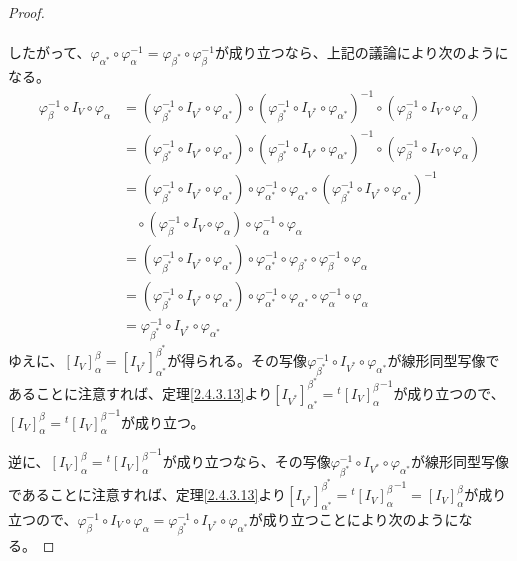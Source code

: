 \documentclass[dvipdfmx]{jsarticle}
\begin{document}
\begin{proof}
\begin{align*}
\end{align*}\par
したがって、$\varphi_{\alpha^{*}} \circ \varphi_{\alpha}^{- 1} = \varphi_{\beta^{*}} \circ \varphi_{\beta}^{- 1}$が成り立つなら、上記の議論により次のようになる。
\begin{align*}
\varphi_{\beta}^{- 1} \circ I_{V} \circ \varphi_{\alpha} &= \left( \varphi_{\beta^{*}}^{- 1} \circ I_{V^{*}} \circ \varphi_{\alpha^{*}} \right) \circ \left( \varphi_{\beta^{*}}^{- 1} \circ I_{V^{*}} \circ \varphi_{\alpha^{*}} \right)^{- 1} \circ \left( \varphi_{\beta}^{- 1} \circ I_{V} \circ \varphi_{\alpha} \right)\\
&= \left( \varphi_{\beta^{*}}^{- 1} \circ I_{V^{*}} \circ \varphi_{\alpha^{*}} \right) \circ \left( \varphi_{\beta^{*}}^{- 1} \circ I_{V^{*}} \circ \varphi_{\alpha^{*}} \right)^{- 1} \circ \left( \varphi_{\beta}^{- 1} \circ I_{V} \circ \varphi_{\alpha} \right)\\
&= \left( \varphi_{\beta^{*}}^{- 1} \circ I_{V^{*}} \circ \varphi_{\alpha^{*}} \right) \circ \varphi_{\alpha^{*}}^{- 1} \circ \varphi_{\alpha^{*}} \circ \left( \varphi_{\beta^{*}}^{- 1} \circ I_{V^{*}} \circ \varphi_{\alpha^{*}} \right)^{- 1} \\
&\quad \circ \left( \varphi_{\beta}^{- 1} \circ I_{V} \circ \varphi_{\alpha} \right) \circ \varphi_{\alpha}^{- 1} \circ \varphi_{\alpha}\\
&= \left( \varphi_{\beta^{*}}^{- 1} \circ I_{V^{*}} \circ \varphi_{\alpha^{*}} \right) \circ \varphi_{\alpha^{*}}^{- 1} \circ \varphi_{\beta^{*}} \circ \varphi_{\beta}^{- 1} \circ \varphi_{\alpha}\\
&= \left( \varphi_{\beta^{*}}^{- 1} \circ I_{V^{*}} \circ \varphi_{\alpha^{*}} \right) \circ \varphi_{\alpha^{*}}^{- 1} \circ \varphi_{\alpha^{*}} \circ \varphi_{\alpha}^{- 1} \circ \varphi_{\alpha}\\
&= \varphi_{\beta^{*}}^{- 1} \circ I_{V^{*}} \circ \varphi_{\alpha^{*}}
\end{align*}
ゆえに、$\left[ I_{V} \right]^{\beta}_{\alpha} = \left[ I_{V^{*}} \right]^{\beta^{*}}_{\alpha^{*}}$が得られる。その写像$\varphi_{\beta^{*}}^{- 1} \circ I_{V^{*}} \circ \varphi_{\alpha^{*}}$が線形同型写像であることに注意すれば、定理\ref{2.4.3.13}より$\left[ I_{V^{*}} \right]^{\beta^{*}}_{\alpha^{*}} ={}^{t}{\left[ I_{V} \right]^{\beta}_{\alpha}}^{- 1}$が成り立つので、$\left[ I_{V} \right]^{\beta}_{\alpha} ={}^{t}{\left[ I_{V} \right]^{\beta}_{\alpha}}^{- 1}$が成り立つ。\par
逆に、$\left[ I_{V} \right]^{\beta}_{\alpha} ={}^{t}{\left[ I_{V} \right]^{\beta}_{\alpha}}^{- 1}$が成り立つなら、その写像$\varphi_{\beta^{*}}^{- 1} \circ I_{V^{*}} \circ \varphi_{\alpha^{*}}$が線形同型写像であることに注意すれば、定理\ref{2.4.3.13}より$\left[ I_{V^{*}} \right]^{\beta^{*}}_{\alpha^{*}} ={}^{t}{\left[ I_{V} \right]^{\beta}_{\alpha}}^{- 1} = \left[ I_{V} \right]^{\beta}_{\alpha}$が成り立つので、$\varphi_{\beta}^{- 1} \circ I_{V} \circ \varphi_{\alpha} = \varphi_{\beta^{*}}^{- 1} \circ I_{V^{*}} \circ \varphi_{\alpha^{*}}$が成り立つことにより次のようになる。

\end{proof}
\end{document}

